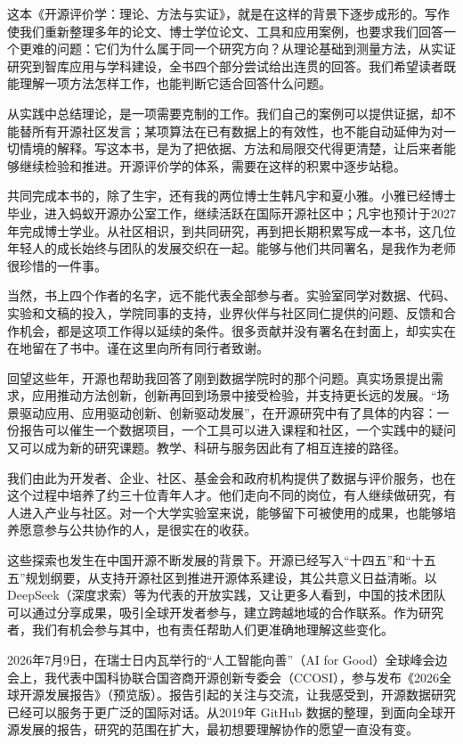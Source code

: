 这本《开源评价学：理论、方法与实证》，就是在这样的背景下逐步成形的。写作使我们重新整理多年的论文、博士学位论文、工具和应用案例，也要求我们回答一个更难的问题：它们为什么属于同一个研究方向？从理论基础到测量方法，从实证研究到智库应用与学科建设，全书四个部分尝试给出连贯的回答。我们希望读者既能理解一项方法怎样工作，也能判断它适合回答什么问题。

从实践中总结理论，是一项需要克制的工作。我们自己的案例可以提供证据，却不能替所有开源社区发言；某项算法在已有数据上的有效性，也不能自动延伸为对一切情境的解释。写这本书，是为了把依据、方法和局限交代得更清楚，让后来者能够继续检验和推进。开源评价学的体系，需要在这样的积累中逐步站稳。

共同完成本书的，除了生宇，还有我的两位博士生韩凡宇和夏小雅。小雅已经博士毕业，进入蚂蚁开源办公室工作，继续活跃在国际开源社区中；凡宇也预计于2027年完成博士学业。从社区相识，到共同研究，再到把长期积累写成一本书，这几位年轻人的成长始终与团队的发展交织在一起。能够与他们共同署名，是我作为老师很珍惜的一件事。

当然，书上四个作者的名字，远不能代表全部参与者。实验室同学对数据、代码、实验和文稿的投入，学院同事的支持，业界伙伴与社区同仁提供的问题、反馈和合作机会，都是这项工作得以延续的条件。很多贡献并没有署名在封面上，却实实在在地留在了书中。谨在这里向所有同行者致谢。

回望这些年，开源也帮助我回答了刚到数据学院时的那个问题。真实场景提出需求，应用推动方法创新，创新再回到场景中接受检验，并支持更长远的发展。“场景驱动应用、应用驱动创新、创新驱动发展”，在开源研究中有了具体的内容：一份报告可以催生一个数据项目，一个工具可以进入课程和社区，一个实践中的疑问又可以成为新的研究课题。教学、科研与服务因此有了相互连接的路径。

我们由此为开发者、企业、社区、基金会和政府机构提供了数据与评价服务，也在这个过程中培养了约三十位青年人才。他们走向不同的岗位，有人继续做研究，有人进入产业与社区。对一个大学实验室来说，能够留下可被使用的成果，也能够培养愿意参与公共协作的人，是很实在的收获。

这些探索也发生在中国开源不断发展的背景下。开源已经写入“十四五”和“十五五”规划纲要，从支持开源社区到推进开源体系建设，其公共意义日益清晰。以 DeepSeek（深度求索）等为代表的开放实践，又让更多人看到，中国的技术团队可以通过分享成果，吸引全球开发者参与，建立跨越地域的合作联系。作为研究者，我们有机会参与其中，也有责任帮助人们更准确地理解这些变化。

2026年7月9日，在瑞士日内瓦举行的“人工智能向善”（AI for Good）全球峰会边会上，我代表中国科协联合国咨商开源创新专委会（CCOSI），参与发布《2026全球开源发展报告》（预览版）。报告引起的关注与交流，让我感受到，开源数据研究已经可以服务于更广泛的国际对话。从2019年 GitHub 数据的整理，到面向全球开源发展的报告，研究的范围在扩大，最初想要理解协作的愿望一直没有变。

